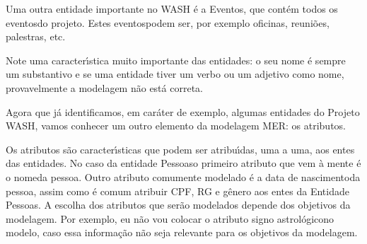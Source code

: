 \documentclass[
12pt,		%
openright,	%
twoside,  %
a4paper,			%
chapter=TITLE,		%
english,			%
french,				%
spanish,			%
brazil				%
]{USPSC-classe/USPSC}
\begin{document}
Uma outra entidade importante no WASH \'e a \textquotedbl Eventos\textquotedbl , que cont\'em todos os \textquotedbl eventos\textquotedbl  do projeto. Estes \textquotedbl eventos\textquotedbl  podem ser, por exemplo \textquotedbl oficinas\textquotedbl , \textquotedbl reuni\~oes\textquotedbl , \textquotedbl palestras\textquotedbl , etc.










Note uma caracter\'{\i}stica muito importante das entidades: o seu nome \'e sempre um substantivo e se uma entidade tiver um verbo ou um adjetivo como nome, provavelmente a modelagem n\~ao est\'a correta.











\noindent\begin{center}\mbox{\centering{}}\end{center}


Agora que j\'a identificamos, em car\'ater de exemplo, algumas entidades do Projeto WASH, vamos conhecer um outro elemento da modelagem MER: os atributos.










Os atributos s\~ao caracter\'{\i}sticas que podem ser atribu\'{\i}das, uma a uma, aos entes das entidades. No caso da entidade \textquotedbl Pessoas\textquotedbl  o primeiro atributo que vem \`a mente \'e o \textquotedbl nome\textquotedbl  da pessoa. Outro atributo comumente modelado \'e a \textquotedbl data de nascimento\textquotedbl  da pessoa, assim como \'e comum atribuir CPF, RG e g\^enero aos entes da Entidade \textquotedbl Pessoas\textquotedbl . A escolha dos atributos que ser\~ao modelados depende dos objetivos da modelagem. Por exemplo, eu n\~ao vou colocar o atributo \textquotedbl signo astrol\'ogico\textquotedbl  no modelo, caso essa informa\c{c}\~ao n\~ao seja relevante para os objetivos da modelagem.
\end{document}
